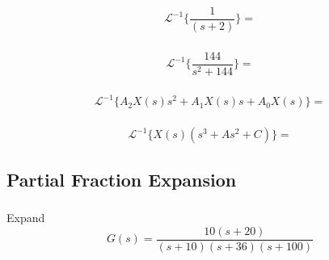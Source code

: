 \documentclass{article}	%
\newcommand{\sL}{\mathcal{L}}
\begin{document}
 \subsubsection{}

 \[
 \sL^{-1} \{ \frac {1}  {(s+2)}  \} =
 \]

%
%
%
 \subsubsection{}

\[
 \sL^{-1} \{ \frac{144}{s^2 + 144}  \} =
\]

%
%
\subsubsection{}

\[
\sL^{-1} \{ A_2X(s)s^2 + A_1X(s)s + A_0 X(s)  \}  =
\]

%
%
\subsubsection{}

\[
\sL^{-1} \{ X(s) (s^3 + As^2+C) \} =
\]

%
%
%
\subsection{Partial Fraction Expansion}
 \subsubsection{}
 Expand
 \[
 G(s)  =  \frac         {10(s+20)}                      {(s+10)(s+36)(s+100)}
 \]

%
%
%
\end{document}
